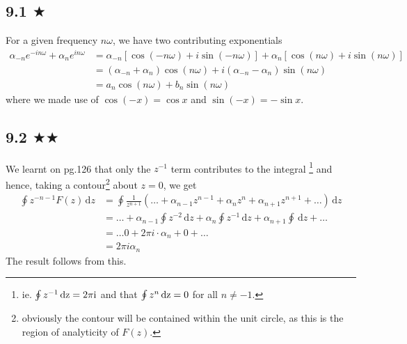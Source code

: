 
\subsection{9.1 $\bigstar$}
For a given frequency $n\omega$, we have two contributing exponentials 
\begin{align*}
\alpha_{-n} e^{-in \omega}+\alpha_n e^{in \omega}&=\alpha_{-n}[\cos (-n\omega)+i\sin (-n\omega)]+\alpha_n[\cos (n\omega)+i\sin (n\omega)]\\
&=(\alpha_{-n}+\alpha_n)\cos (n\omega)+i(\alpha_{-n}-\alpha_n)\sin (n\omega)\\
&=a_n\cos (n\omega)+b_n\sin (n\omega)
\end{align*} 
where we made use of $\cos(-x)=\cos x$ and $\sin (-x)=-\sin x$.


\subsection{9.2 $\bigstar \bigstar$}
We learnt on pg.126 that only the $z^{-1}$ term contributes to the integral \footnote{ie. $\oint z^{-1}\,\rm{d}z=2\pi i$ and that $\oint z^{n}\,\rm{d}z=0$ for all $n\neq -1$.} and hence, taking a contour\footnote{obviously the contour will be contained within the unit circle, as this is the region of analyticity of $F(z)$.} about $z=0$, we get
\begin{align*}
\oint z^{-n-1} F(z)\, \text{d}z&=\oint \frac{1}{z^{n+1}} \left (\ldots +\alpha_{n-1}z^{n-1}+\alpha_{n}z^{n}+\alpha_{n+1}z^{n+1}+\ldots \right )\, \text{d}z\\
&= \ldots +\alpha_{n-1}\oint z^{-2} \, \text{d}z+\alpha_{n} \oint z^{-1}\, \text{d}z+\alpha_{n+1}\oint \, \text{d}z+\ldots \\
&=\ldots 0+2\pi i\cdot \alpha_n +0+\ldots\\
&=2\pi i \alpha_n
\end{align*}
The result follows from this.
